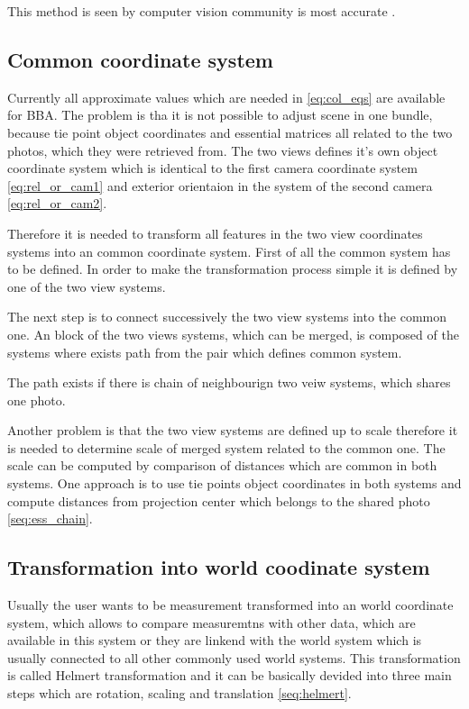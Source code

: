 \documentclass[a4paper,12pt]{report}
\begin{document}
This method is seen by computer vision community is most accurate \cite[p. 315]{Hartley2004}.  


\subsection{Common coordinate system}

Currently all approximate values which are needed in \eqref{eq:col_eqs} are available for BBA. 
The problem is tha it is not possible to adjust scene in one bundle, because tie point 
object coordinates and essential matrices all related to the two photos, which they were 
retrieved from. The two views defines it's own object coordinate system which is identical
to the first camera coordinate system \eqref{eq:rel_or_cam1} and
exterior orientaion in the system of the second camera \eqref{eq:rel_or_cam2}.


Therefore it is needed to transform all features in the two view coordinates systems into 
an common coordinate system. First of all the common system has to be defined.
In order to make the transformation process simple it is defined by one of the two view
systems.

The next step is to connect successively the two view systems into the common one.  
An block of the two views systems, which can be merged, is composed of the systems 
where exists path from the pair which defines common system.

The path exists if there is chain of neighbourign two veiw systems, which 
shares one photo. 

Another problem is that the two view systems are defined up to scale therefore 
it is needed to determine scale of merged system related to the common one. 
The scale can be computed by comparison of distances which are common in both systems.
One approach is to use tie points object coordinates in both systems 
and compute distances from projection center which belongs to the shared photo \ref{seq:ess_chain}. 


\subsection{Transformation into world coodinate system}

Usually the user wants to be measurement transformed into an world coordinate system, which allows 
to compare measuremtns with other data, which are available in this system or they are 
linkend with the world system which is usually connected to all other commonly used  world systems. 
This transformation is called Helmert  transformation and it can be basically devided into 
three main steps which are rotation, scaling and translation \ref{seq:helmert}.
\end{document}
